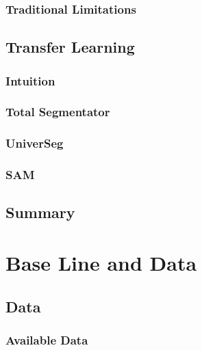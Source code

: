 \documentclass[11pt,twoside]{report}
\begin{document}
\subsection{Traditional Limitations}\label{sect:vanilla-limitations}

\section{Transfer Learning}\label{sect:transfer-learning}

\subsection{Intuition}\label{sect:transfer-learning-intuition}

\subsection{Total Segmentator}\label{sect:totalseg}

\subsection{UniverSeg}\label{sect:universeg}

\subsection{SAM}\label{sect:sam}

\section{Summary}\label{sect:background-summary}

\chapter{Base Line and Data}\label{sect:baseline-and-data}

\section{Data}\label{sect:data}

\subsection{Available Data}\label{sect:available-data}

\end{document}
